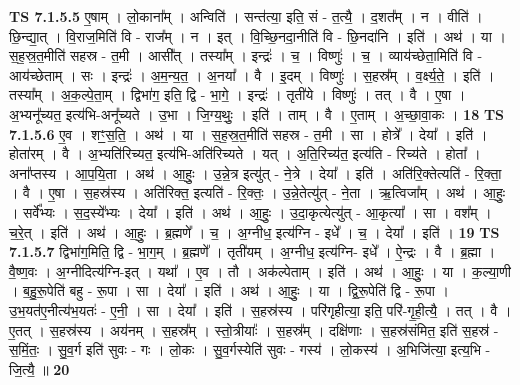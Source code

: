 \documentclass[17pt]{extarticle}
\begin{document}
                  \newline
                                \textbf{ TS 7.1.5.5} \newline
                  ए॒षाम् । लो॒काना᳚म् । अन्विति॑ । सन्त॑त्या॒ इति॒ सं - त॒त्यै॒ । द॒शत᳚म् । न । वीति॑ । छि॒न्द्या॒त् । वि॒राज॒मिति॑ वि - राज᳚म् । न । इत् । वि॒च्छि॒नदा॒नीति॑ वि - छि॒नदा॑नि । इति॑ । अथ॑ । या । स॒ह॒स्र॒त॒मीति॑ सहस्र - त॒मी । आसी᳚त् । तस्या᳚म् । इन्द्रः॑ । च॒ । विष्णुः॑ । च॒ । व्याय॑च्छेता॒मिति॑ वि - आय॑च्छेताम् । सः । इन्द्रः॑ । अ॒म॒न्य॒त॒ । अ॒नया᳚ । वै । इ॒दम् । विष्णुः॑ । स॒हस्र᳚म् । व॒र्क्ष्य॒ते॒ । इति॑ । तस्या᳚म् । अ॒क॒ल्पे॒ता॒म् । द्विभा॑ग॒ इति॒ द्वि - भा॒गे॒ । इन्द्रः॑ । तृती॑ये । विष्णुः॑ । तत् । वै । ए॒षा । अ॒भ्यनू᳚च्यत॒ इत्य॑भि-अनू᳚च्यते । उ॒भा । जि॒ग्य॒थुः॒ । इति॑ । ताम् । वै । ए॒ताम् । अ॒च्छा॒वा॒कः । \textbf{  18} \newline
                  \newline
                                \textbf{ TS 7.1.5.6} \newline
                  ए॒व । शꣳ॒॒स॒ति॒ । अथ॑ । या । स॒ह॒स्र॒त॒मीति॑ सहस्र - त॒मी । सा । होत्रे᳚ । देया᳚ । इति॑ । होता॑रम् । वै । अ॒भ्यति॑रिच्यत॒ इत्य॑भि-अति॑रिच्यते । यत् । अ॒ति॒रिच्य॑त॒ इत्य॑ति - रिच्य॑ते । होता᳚ । अना᳚प्तस्य । आ॒प॒यि॒ता । अथ॑ । आ॒हुः॒ । उ॒न्ने॒त्र इत्यु॑त् - ने॒त्रे । देया᳚ । इति॑ । अति॑रि॒क्तेत्यति॑ - रि॒क्ता॒ । वै । ए॒षा । स॒हस्र॑स्य । अति॑रिक्त॒ इत्यति॑ - रि॒क्तः॒ । उ॒न्ने॒तेत्यु॑त् - ने॒ता । ऋ॒त्विजा᳚म् । अथ॑ । आ॒हुः॒ । सर्वे᳚भ्यः । स॒द॒स्ये᳚भ्यः । देया᳚ । इति॑ । अथ॑ । आ॒हुः॒ । उ॒दा॒कृत्येत्यु॑त् - आ॒कृत्या᳚ । सा । वश᳚म् । च॒रे॒त् । इति॑ । अथ॑ । आ॒हुः॒ । ब्र॒ह्मणे᳚ । च॒ । अ॒ग्नीध॒ इत्य॑ग्नि - इधे᳚ । च॒ । देया᳚ । इति॑ । \textbf{  19} \newline
                  \newline
                                \textbf{ TS 7.1.5.7} \newline
                  द्विभा॑ग॒मिति॒ द्वि - भा॒ग॒म् । ब्र॒ह्मणे᳚ । तृती॑यम् । अ॒ग्नीध॒ इत्य॑ग्नि- इधे᳚ । ऐ॒न्द्रः । वै । ब्र॒ह्मा । वै॒ष्ण॒वः । अ॒ग्नीदित्य॑ग्नि-इत् । यथा᳚ । ए॒व । तौ । अक॑ल्पेताम् । इति॑ । अथ॑ । आ॒हुः॒ । या । क॒ल्या॒णी । ब॒हु॒रू॒पेति॑ बहु - रू॒पा । सा । देया᳚ । इति॑ । अथ॑ । आ॒हुः॒ । या । द्वि॒रू॒पेति॑ द्वि - रू॒पा । उ॒भ॒यत॑ए॒नीत्य॑भ॒यतः॑ - ए॒नी॒ । सा । देया᳚ । इति॑ । स॒हस्र॑स्य । परि॑गृहीत्या॒ इति॒ परि॑-गृ॒ही॒त्यै॒ । तत् । वै । ए॒तत् । स॒हस्र॑स्य । अय॑नम् । स॒हस्र᳚म् । स्तो॒त्रीयाः᳚ । स॒हस्र᳚म् । दक्षि॑णाः । स॒हस्र॑संमित॒ इति॑ स॒हस्र॑ - स॒मिं॒तः॒ । सु॒व॒र्ग इति॑ सुवः - गः । लो॒कः । सु॒व॒र्गस्येति॑ सुवः - गस्य॑ । लो॒कस्य॑ । अ॒भिजि॑त्या॒ इत्य॒भि - जि॒त्यै॒ ॥ \textbf{  20} \newline
\end{document}
